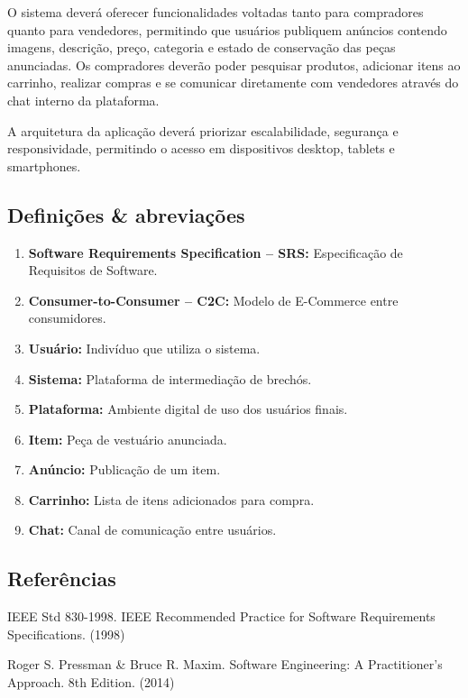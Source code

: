 \documentclass[
	article,			%
	11pt,				%
	oneside,			%
	a4paper,			%
	english,			%
	brazil,				%
	sumario=tradicional
	]{abntex2}
\begin{document}
O sistema deverá oferecer funcionalidades voltadas tanto para compradores quanto para vendedores, permitindo que usuários publiquem anúncios contendo imagens, descrição, preço, categoria e estado de conservação das peças anunciadas. Os compradores deverão poder pesquisar produtos, adicionar itens ao carrinho, realizar compras e se comunicar diretamente com vendedores através do chat interno da plataforma.

A arquitetura da aplicação deverá priorizar escalabilidade, segurança e responsividade, permitindo o acesso em dispositivos desktop, tablets e smartphones.

\subsection{Definições \& abreviações}
\label{sec:Definicoes}

\begin{enumerate}[label=\alph*)]
    \item \textbf{Software Requirements Specification – SRS:} Especificação de Requisitos de Software.
    \item \textbf{Consumer-to-Consumer – C2C:} Modelo de E-Commerce entre consumidores.
    \item \textbf{Usuário:} Indivíduo que utiliza o sistema.
    \item \textbf{Sistema:} Plataforma de intermediação de brechós.
    \item \textbf{Plataforma:} Ambiente digital de uso dos usuários finais.
    \item \textbf{Item:} Peça de vestuário anunciada.
    \item \textbf{Anúncio:} Publicação de um item.
    \item \textbf{Carrinho:} Lista de itens adicionados para compra.
    \item \textbf{Chat:} Canal de comunicação entre usuários.
\end{enumerate}

\subsection{Referências}
\label{sec:Referencias}

IEEE Std 830-1998. IEEE Recommended Practice for Software Requirements Specifications. (1998)

Roger S. Pressman \& Bruce R. Maxim. Software Engineering: A Practitioner's Approach. 8th Edition. (2014)
\end{document}
